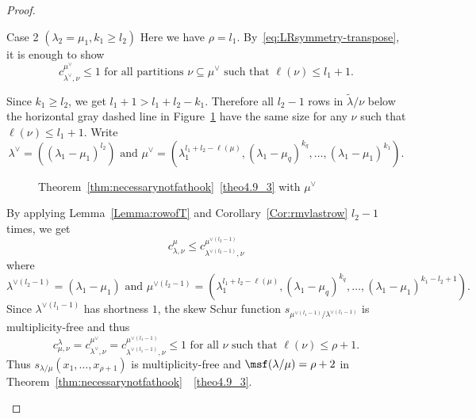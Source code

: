 \begin{proof}
\begin{Case}
{Case 2 $(\lambda_2 = \mu_1, k_1\geq l_2)$} 
Here we have $\rho = l_1$. By~\eqref{eq:LRsymmetry-transpose}, it is enough to show
\[
c^{\mu^\vee}_{\lambda^\vee,\nu}\leq 1\text{ for all partitions }\nu\subseteq \mu^\vee \text{ such that }\ell(\nu)\leq l_1+1.
\]


Since $k_1\geq l_2$, we get $l_1+1 > l_1+l_2-k_1$. Therefore all $l_2-1$ rows in $\tilde\lambda/\nu$ below the horizontal gray dashed line in Figure~\ref{case2anecessary} have the same size for any $\nu$ such that $\ell(\nu)\leq l_1+1$. 
Write
\[
\lambda^\vee = ((\lambda_1-\mu_1)^{l_2})\text{ and }\mu^\vee = (\lambda_1^{l_1+l_2-\ell(\mu)},(\lambda_1-\mu_q)^{k_q},\ldots,(\lambda_1-\mu_1)^{k_1}).
\]

\begin{figure}[htb]\centering
 \caption{Theorem~\ref{thm:necessarynotfathook}~\ref{theo4.9_3} with $\mu^\vee$}
 \label{case2anecessary} 

\end{figure}

\noindent
By applying Lemma~\ref{Lemma:rowofT} and Corollary~\ref{Cor:rmvlastrow} $l_2-1$ times, we get
\[
c^{\mu}_{\lambda,\nu} \leq c^{\mu^{\vee(l_2-1)}}_{\lambda^{\vee(l_2-1)},\nu}
\]
where
\[
\lambda^{\vee(l_2-1)} = (\lambda_1-\mu_1)\text{ and }\mu^{\vee(l_2-1)} = (\lambda_1^{l_1+l_2-\ell(\mu)},(\lambda_1-\mu_q)^{k_q},\ldots,(\lambda_1-\mu_1)^{k_1-l_2+1}).
\]
Since $\lambda^{\vee(l_1-1)}$ has shortness $1$, the skew Schur function $s_{\mu^{\vee(l_1-1)}/\lambda^{\vee(l_1-1)}}$ is multiplicity-free and thus 
\[
c^{\lambda}_{\mu,\nu} = c^{\mu^\vee}_{\lambda^\vee,\nu} = c^{\mu^{\vee(l_1-1)}}_{\lambda^{\vee(l_1-1)},\nu} \leq 1\text{ for all }\nu\text{ such that }\ell(\nu)\leq \rho+1.
\]
Thus $s_{\lambda/\mu}(x_1,\ldots,x_{\rho+1})$ is multiplicity-free and ${\msf }(\lambda/\mu) = \rho+2$ in Theorem~\ref{thm:necessarynotfathook}~~\ref{theo4.9_3}.\qedhere
\end{Case}


\end{proof}
